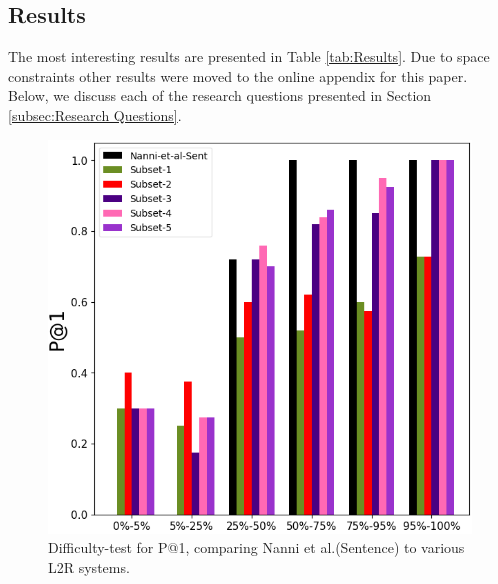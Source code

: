 \documentclass[sigconf,authordraft]{acmart}
\begin{document}
\subsection{Results}
\label{subsec:Results}
The most interesting results are presented in Table \ref{tab:Results}. Due to space constraints other results were moved to the online appendix for this paper. Below, we discuss each of the research questions presented in Section \ref{subsec:Research Questions}.


\begin{figure}
    \centering
    \includegraphics [scale=0.5]{plot-cropped.png}
    \caption{Difficulty-test for P@1, comparing Nanni et al.(Sentence) to various L2R systems.}
    \label{fig:difficulty-plot}
\end{figure}
\end{document}
